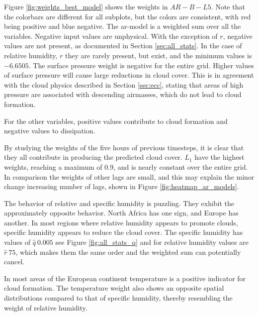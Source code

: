 Figure \ref{fig:weights_best_model} shows the weights in $AR-B-L5$. Note that the colorbars are different for all subplots, but the colors are consistent, with red being positive and blue negative. The \acrshort{ar}-model is a weighted sum over all the variables. Negative input values are unphysical. With the exception of $r$, negative values are not present, as documented in Section \ref{sec:all_stats}. In the case of relative humidity, $r$ they are rarely present, but exist, and the minimum values is $-6.6505$. 
The surface pressure weight is negative for the entire grid. Higher values of surface pressure will cause large reductions in cloud cover.
This is in agreement with the cloud physics described in Section \ref{sec:ecc}, stating that areas of high pressure are associated with descending airmasses, which do not lead to cloud formation.

For the other variables, positive values contribute to cloud formation and negative values to dissipation.

By studying the weights of the five hours of previous timesteps, it is clear that they all contribute in producing the predicted cloud cover. $L_1$ have the highest weights, reaching a maximum of 0.9, and is nearly constant over the entire grid. 
In comparison the weights of other lags are small, and this may explain the minor change increasing number of lags, shown in Figure \ref{fig:heatmap_ar_models}. 

The behavior of relative and specific humidity is puzzling. They exhibit the approximately opposite behavior. North Africa has one sign, and Europe has another. In most regions where relative humidity appears to promote clouds, specific humidity appears to reduce the cloud cover. 
The specific humidity has values of $\hat{q}~0.005$ see Figure \ref{fig:all_stats_q} and for relative humidity values are $\hat{r}~75$, which makes them the same order and the weighted sum can potentially cancel. 

In most areas of the European continent temperature is a positive indicator for cloud formation. The temperature weight also shows an opposite spatial distributions compared to that of specific humidity, thereby resembling the weight of relative humidity. 

